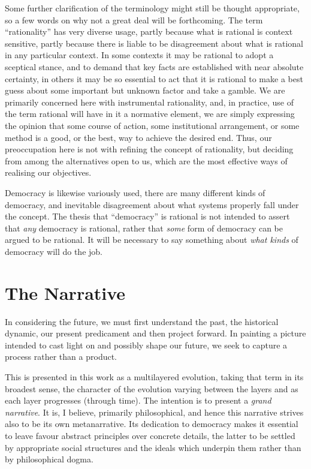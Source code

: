 Some further clarification of the terminology might still be thought appropriate, so a few words on why not a great deal will be forthcoming.
The term ``rationality'' has very diverse usage, partly because what is rational is context sensitive, partly because there is liable to be disagreement about what is rational in any particular context.
In some contexts it may be rational to adopt a sceptical stance, and to demand that key facts are established with near absolute certainty, in others it may be so essential to act that it is rational to make a best guess about some important but unknown factor and take a gamble.
We are primarily concerned here with instrumental rationality, and, in practice, use of the term rational will have in it a normative element, we are simply expressing the opinion that some course of action, some institutional arrangement, or some method is a good, or the best, way to achieve the desired end.
Thus, our preoccupation here is not with refining the concept of rationality, but deciding from among the alternatives open to us, which are the most effective ways of realising our objectives.

Democracy is likewise variously used, there are many different kinds of democracy, and inevitable disagreement about what systems properly fall under the concept.
The thesis that ``democracy'' is rational is not intended to assert that \emph{any} democracy is rational, rather that \emph{some} form of democracy can be argued to be rational.
It will be necessary to say something about \emph{what kinds} of democracy will do the job.

\section{The Narrative}

In considering the future, we must first understand the past, the historical dynamic, our present predicament and then project forward.
In painting a picture intended to cast light on and possibly shape our future, we seek to capture a process rather than a product.

This is presented in this work as a multilayered evolution, taking that term in its broadest sense, the character of the evolution varying between the layers and as each layer progresses (through time).
The intention is to present a {\it grand narrative}.
It is, I believe, primarily philosophical, and hence this narrative strives also to be its own metanarrative.
Its dedication to democracy makes it essential to leave favour abstract principles over concrete details, the latter to be settled by appropriate social structures and the ideals which underpin them rather than by philosophical dogma.

